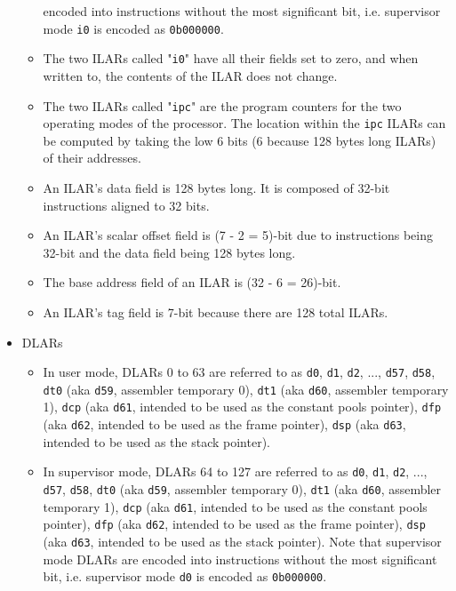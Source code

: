 \documentclass{article}
\begin{document}
\begin{itemize}
\begin{itemize}
			encoded into instructions without the most significant bit,
			i.e. supervisor mode \texttt{i0} is encoded as
			\texttt{0b000000}.
		\item The two ILARs called "\texttt{i0}" have all their
			fields set to zero, and when written to, the contents of the
			ILAR does not change.
		\item The two ILARs called "\texttt{ipc}" are the program counters
			for the two operating modes of the processor. The location
			within the \texttt{ipc} ILARs can be computed by taking the low
			6 bits (6 because 128 bytes long ILARs) of their addresses.
		\item An ILAR's data field is 128 bytes long. It is composed of
			32-bit instructions aligned to 32 bits.
		\item An ILAR's scalar offset field is (7 - 2 = 5)-bit due to
			instructions being 32-bit and the data field being 128 bytes
			long.
		\item The base address field of an ILAR is (32 - 6 = 26)-bit.
		\item An ILAR's tag field is 7-bit because there are 128 total
			ILARs.
		\end{itemize}
	\item DLARs
		\begin{itemize}
		\item In user mode, DLARs 0 to 63 are referred to as 
			\texttt{d0}, \texttt{d1}, \texttt{d2}, ..., \texttt{d57},
			\texttt{d58},
			\texttt{dt0} (aka \texttt{d59}, assembler temporary 0),
			\texttt{dt1} (aka \texttt{d60}, assembler temporary 1),
			\texttt{dcp} (aka \texttt{d61},
				intended to be used as the constant pools pointer),
			\texttt{dfp} (aka \texttt{d62},
				intended to be used as the frame pointer),
			\texttt{dsp} (aka \texttt{d63},
				intended to be used as the stack pointer).
		\item In supervisor mode, DLARs 64 to 127 are referred to as
			\texttt{d0}, \texttt{d1}, \texttt{d2}, ..., \texttt{d57},
			\texttt{d58},
			\texttt{dt0} (aka \texttt{d59}, assembler temporary 0),
			\texttt{dt1} (aka \texttt{d60}, assembler temporary 1),
			\texttt{dcp} (aka \texttt{d61},
				intended to be used as the constant pools pointer),
			\texttt{dfp} (aka \texttt{d62},
				intended to be used as the frame pointer),
			\texttt{dsp} (aka \texttt{d63},
				intended to be used as the stack pointer).
			Note that supervisor mode DLARs are encoded into instructions
			without the most significant bit, i.e. supervisor mode
			\texttt{d0} is encoded as \texttt{0b000000}.

\end{itemize}
\end{itemize}
\end{document}
